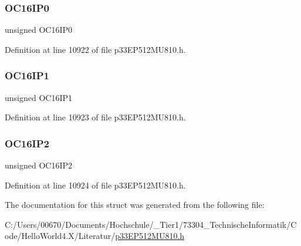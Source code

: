 \subsubsection{\texorpdfstring{O\+C16\+I\+P0}{OC16IP0}}
{\footnotesize\ttfamily unsigned O\+C16\+I\+P0}



Definition at line 10922 of file p33\+E\+P512\+M\+U810.\+h.

\mbox{\label{structtag_i_p_c35_b_i_t_s_a1cb4a21e4f56ce3a39c187f80c95e819}} 
\subsubsection{\texorpdfstring{O\+C16\+I\+P1}{OC16IP1}}
{\footnotesize\ttfamily unsigned O\+C16\+I\+P1}



Definition at line 10923 of file p33\+E\+P512\+M\+U810.\+h.

\mbox{\label{structtag_i_p_c35_b_i_t_s_a95cad14fb3e48bafa25838b9cb8ef6af}} 
\subsubsection{\texorpdfstring{O\+C16\+I\+P2}{OC16IP2}}
{\footnotesize\ttfamily unsigned O\+C16\+I\+P2}



Definition at line 10924 of file p33\+E\+P512\+M\+U810.\+h.



The documentation for this struct was generated from the following file\+:\begin{DoxyCompactItemize}
\item 
C\+:/\+Users/00670/\+Documents/\+Hochschule/\+\_\+\+Tier1/73304\+\_\+\+Technische\+Informatik/\+Code/\+Hello\+World4.\+X/\+Literatur/\hyperlink{p33_e_p512_m_u810_8h}{p33\+E\+P512\+M\+U810.\+h}\end{DoxyCompactItemize}

